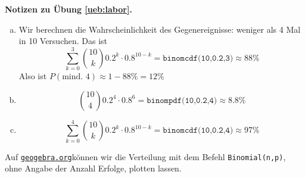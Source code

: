 \documentclass[%
11pt,%
twoside,%
titlepage,%
german,%
headsepline%
]{scrartcl}
\newcommand{\geogebralink}{\href{https://www.geogebra.org/calculator}{\texttt{geogebra.org}}}
\newcommand{\concatueb}[1]{ueb:#1}%
\newcommand{\concatlsg}[1]{lsg:#1}%
\newenvironment{lsg}[1]{%
    \par\noindent\textbf{Notizen zu Übung \ref{\concatueb{#1}}.}%
    \label{\concatlsg{#1}}
}{%
    \par%
}
\begin{document}
\begin{lsg}{labor}
    \begin{enumerate}[a)]
        \item Wir berechnen die Wahrscheinlichkeit des Gegenereignisse: weniger als 4 Mal in 10 Versuchen. Das ist
        $$\sum_{k=0}^3\binom{10}{k}0.2^k\cdot0.8^{10-k}=\texttt{binomcdf(10,0.2,3)}\approx88\%$$
        Also ist $P(\text{mind. 4})\approx1-88\%=12\%$
        \item $$\binom{10}{4}0.2^4\cdot0.8^6=\texttt{binompdf(10,0.2,4)}\approx8.8\%$$
        \item $$\sum_{k=0}^4\binom{10}{k}0.2^k\cdot0.8^{10-k}=\texttt{binomcdf(10,0.2,4)}\approx97\%$$
    \end{enumerate}
    Auf \geogebralink können wir die Verteilung mit dem Befehl \texttt{Binomial(n,p)}, ohne Angabe der Anzahl Erfolge, plotten lassen.

\begin{center}
\end{center}
\end{lsg}
\end{document}
